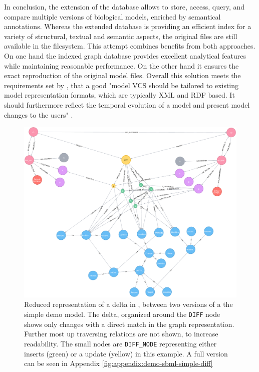 In conclusion, the extension of the \masymos database allows to store, access, query, and compare multiple versions of biological models, enriched by semantical annotations. Whereas the extended \masymos database is providing an efficient index for a variety of structural, textual and semantic aspects, the original files are still available in the filesystem.
This attempt combines benefits from both approaches.
On one hand the indexed graph database provides excellent analytical features while maintaining reasonable performance. On the other hand it ensures the exact reproduction of the original model files.
Overall this solution meets the requirements set by \citet{Waltemath2013}, that a good "model VCS should be tailored to existing model  representation formats, which are typically XML and RDF based. It should furthermore reflect the temporal evolution of a model and present model changes to the users" \citep{Waltemath2013}.

\begin{figure}[h]
	\centering
	\includegraphics[width=\textwidth]{resources/neo4j-renders/demo-sbml-simple-diff.pdf}
	\caption[Reduced representation of a delta in \masymos, between two versions of a the simple \sbml demo model]{Reduced representation of a delta in \masymos, between two versions of a the simple \sbml demo model. The delta, organized around the \texttt{DIFF} node shows only changes with a direct match in the graph representation. Further most up traversing relations are not shown, to increase readability.
		The small nodes are \texttt{DIFF\_NODE} representing either inserts (green) or a update (yellow) in this example. A full version can be seen in Appendix \ref{fig:appendix:demo-sbml-simple-diff}}
	\label{fig:results:simple-diff}
\end{figure}
 
